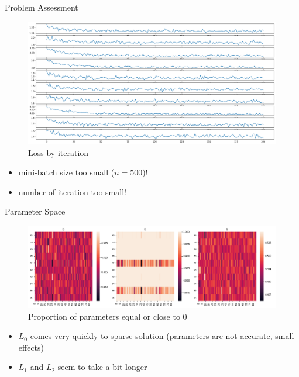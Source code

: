 \documentclass{beamer}
\begin{document}
\begin{frame}[t]{Problem Assessment}
  \begin{figure}[htpb]
    \centering
    \includegraphics[width=0.8\linewidth]{loss_iteration_problem.png}
    \caption{Loss by iteration}
  \end{figure}
  \begin{itemize}
    \item mini-batch size too small ($n=500$)!
    \item number of iteration too small!
  \end{itemize}
\end{frame}

\begin{frame}[t]{Parameter Space}
  \begin{figure}[htpb]
    \centering
    \includegraphics[width=0.99\linewidth]{null_proportion.png}
    \caption{Proportion of parameters equal or close to 0}
  \end{figure}
  \begin{itemize}
    \item $L_0$ comes very quickly to sparse solution (parameters are not accurate, small effects)
    \item $L_1$ and $L_2$ seem to take a bit longer
  \end{itemize}
\end{frame}
\end{document}
